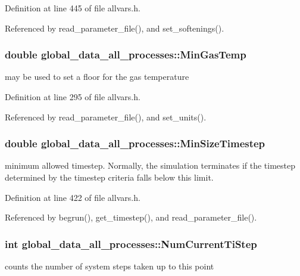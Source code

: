 Definition at line 445 of file allvars.h.



Referenced by read\_\-parameter\_\-file(), and set\_\-softenings().

\hypertarget{structglobal__data__all__processes_a728a84084280f547b1b68dbb143570ad}{
\subsubsection[{MinGasTemp}]{\setlength{\rightskip}{0pt plus 5cm}double {\bf global\_\-data\_\-all\_\-processes::MinGasTemp}}}
\label{structglobal__data__all__processes_a728a84084280f547b1b68dbb143570ad}
may be used to set a floor for the gas temperature 

Definition at line 295 of file allvars.h.



Referenced by read\_\-parameter\_\-file(), and set\_\-units().

\hypertarget{structglobal__data__all__processes_ab5f56d94a4417c5a703b6d2d4cb81a05}{
\subsubsection[{MinSizeTimestep}]{\setlength{\rightskip}{0pt plus 5cm}double {\bf global\_\-data\_\-all\_\-processes::MinSizeTimestep}}}
\label{structglobal__data__all__processes_ab5f56d94a4417c5a703b6d2d4cb81a05}
minimum allowed timestep. Normally, the simulation terminates if the timestep determined by the timestep criteria falls below this limit. 

Definition at line 422 of file allvars.h.



Referenced by begrun(), get\_\-timestep(), and read\_\-parameter\_\-file().

\hypertarget{structglobal__data__all__processes_a35de8a7666698b80478bfedf4362e844}{
\subsubsection[{NumCurrentTiStep}]{\setlength{\rightskip}{0pt plus 5cm}int {\bf global\_\-data\_\-all\_\-processes::NumCurrentTiStep}}}
\label{structglobal__data__all__processes_a35de8a7666698b80478bfedf4362e844}
counts the number of system steps taken up to this point 

